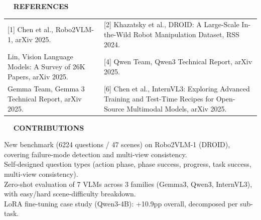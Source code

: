 \documentclass[
portrait,
a0paper%
]
{baposter}
\begin{document}
\begin{poster}
{  %
  \begin{minipage}[t][2.8cm]{.48\textwidth}
  \begin{center}
	\vspace{0.25cm}
	$\quad$\textbf{\small\color{myblack} REFERENCES}\footnotesize\\
\end{center}
{\fontsize{7}{8}\selectfont
\vspace{-0.2cm}
\setlength{\tabcolsep}{4pt}
\renewcommand{\arraystretch}{1.2}
\begin{tabular}{p{}p{}}
[1] Chen et al., Robo2VLM-1, arXiv 2025. &
[2] Khazatsky et al., DROID: A Large-Scale In-the-Wild Robot Manipulation Dataset, RSS 2024. \\
[3] Lin, Vision Language Models: A Survey of 26K Papers, arXiv 2025. &
[4] Qwen Team, Qwen3 Technical Report, arXiv 2025. \\
[5] Gemma Team, Gemma 3 Technical Report, arXiv 2025. &
[6] Chen et al., InternVL3: Exploring Advanced Training and Test-Time Recipes for Open-Source Multimodal Models, arXiv 2025. \\
\end{tabular}
}

\vspace{-0.2cm}

  \end{minipage}
  \hfill\vline\hfill
  \begin{minipage}[t][2.8cm]{.48\textwidth}
  \begin{center}
	\vspace{0.25cm}
	$\quad$\textbf{\small\color{myblack}  CONTRIBUTIONS}\footnotesize\\
\end{center}
{\fontsize{8}{9}\selectfont
\vspace{-0.2cm}
New benchmark (6224 questions / 47 scenes) on Robo2VLM-1 (DROID), covering failure-mode detection and multi-view consistency.\\
Self-designed question types (action phase, phase success, progress, task success, multi-view consistency).\\
Zero-shot evaluation of 7 VLMs across 3 families (Gemma3, Qwen3, InternVL3), with easy/hard scene-difficulty breakdown.\\
LoRA fine-tuning case study (Qwen3-4B): +10.9pp overall, decomposed per sub-task.
\vspace{-0.2cm}

}
\end{minipage}}
\end{poster}
\end{document}
